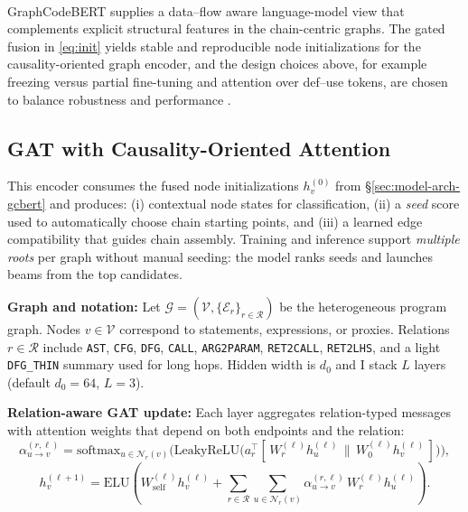 \documentclass{buthesis}
\begin{document}
\paragraph{}
GraphCodeBERT supplies a data–flow aware language-model view that complements explicit structural features in the chain-centric graphs. The gated fusion in \eqref{eq:init} yields stable and reproducible node initializations for the causality-oriented graph encoder, and the design choices above, for example freezing versus partial fine-tuning and attention over def–use tokens, are chosen to balance robustness and performance \cite{guo2021graphcodebert,Li2022Empirical}.


\subsection{GAT with Causality\texorpdfstring{-}{-}Oriented Attention}
\label{sec:model-arch-gat}

This encoder consumes the fused node initializations $h^{(0)}_v$ from \S\ref{sec:model-arch-gcbert} and produces: (i) contextual node states for classification, (ii) a \emph{seed} score used to automatically choose chain starting points, and (iii) a learned edge compatibility that guides chain assembly. Training and inference support \emph{multiple roots} per graph without manual seeding: the model ranks seeds and launches beams from the top candidates.

\textbf{Graph and notation:} Let $\mathcal{G}=(\mathcal{V},\{\mathcal{E}_r\}_{r\in\mathcal{R}})$ be the heterogeneous program graph. Nodes $v\in\mathcal{V}$ correspond to statements, expressions, or proxies. Relations $r\in\mathcal{R}$ include \texttt{AST}, \texttt{CFG}, \texttt{DFG}, \texttt{CALL}, \texttt{ARG2PARAM}, \texttt{RET2CALL}, \texttt{RET2LHS}, and a light \texttt{DFG\_THIN} summary used for long hops. Hidden width is $d_0$ and I stack $L$ layers (default $d_0{=}64$, $L{=}3$).

\textbf{Relation-aware GAT update:} Each layer aggregates relation-typed messages with attention weights that depend on both endpoints and the relation:
\begin{equation}
\label{eq:gat-alpha}
\alpha^{(r,\ell)}_{u\to v}
=
\mathrm{softmax}_{u\in\mathcal{N}_r(v)}
\big(
\mathrm{LeakyReLU}\big(a_r^\top [\,W^{(\ell)}_r h^{(\ell)}_u \, \| \, W^{(\ell)}_0 h^{(\ell)}_v\,]\big)
\big),
\end{equation}
\begin{equation}
\label{eq:gat-update}
h^{(\ell+1)}_v
=
\mathrm{ELU}\!\left(
W^{(\ell)}_{\mathrm{self}} h^{(\ell)}_v
+
\sum_{r\in\mathcal{R}}
\sum_{u\in\mathcal{N}_r(v)}
\alpha^{(r,\ell)}_{u\to v}\, W^{(\ell)}_r h^{(\ell)}_u
\right).
\end{equation}
\end{document}
